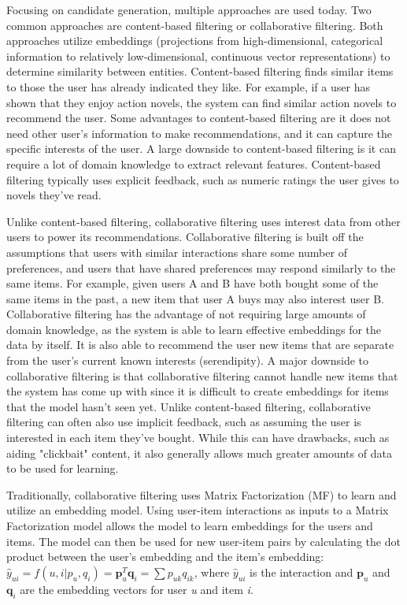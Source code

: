 \documentclass{article}
\begin{document}
Focusing on candidate generation, multiple approaches are used today. Two common approaches are content-based filtering or collaborative filtering. Both approaches utilize embeddings (projections from high-dimensional, categorical information to relatively low-dimensional, continuous vector representations) to determine similarity between entities. Content-based filtering finds similar items to those the user has already indicated they like. For example, if a user has shown that they enjoy action novels, the system can find similar action novels to recommend the user. Some advantages to content-based filtering are it does not need other user’s information to make recommendations, and it can capture the specific interests of the user. A large downside to content-based filtering is it can require a lot of domain knowledge to extract relevant features. Content-based filtering typically uses explicit feedback, such as numeric ratings the user gives to novels they've read.

Unlike content-based filtering, collaborative filtering uses interest data from other users to power its recommendations. Collaborative filtering is built off the assumptions that users with similar interactions share some number of preferences, and users that have shared preferences may respond similarly to the same items. For example, given users A and B have both bought some of the same items in the past, a new item that user A buys may also interest user B. Collaborative filtering has the advantage of not requiring large amounts of domain knowledge, as the system is able to learn effective embeddings for the data by itself. It is also able to recommend the user new items that are separate from the user's current known interests (serendipity). A major downside to collaborative filtering is that collaborative filtering cannot handle new items that the system has come up with since it is difficult to create embeddings for items that the model hasn’t seen yet. Unlike content-based filtering, collaborative filtering can often also use implicit feedback, such as assuming the user is interested in each item they've bought. While this can have drawbacks, such as aiding "clickbait" content, it also generally allows much greater amounts of data to be used for learning.

Traditionally, collaborative filtering uses Matrix Factorization (MF) to learn and utilize an embedding model. Using user-item interactions as inputs to a Matrix Factorization model allows the model to learn embeddings for the users and items. The model can then be used for new user-item pairs by calculating the dot product between the user's embedding and the item's embedding: $\hat{y}_{ui} = f(u,i|p_u,q_i) = \textbf{p}^T_u\textbf{q}_i = \sum{p_{uk}q_{ik}}$, where $\hat{y}_{ui}$ is the interaction and $\textbf{p}_u$ and $\textbf{q}_i$ are the embedding vectors for user \textit{u} and item \textit{i}.
\end{document}
